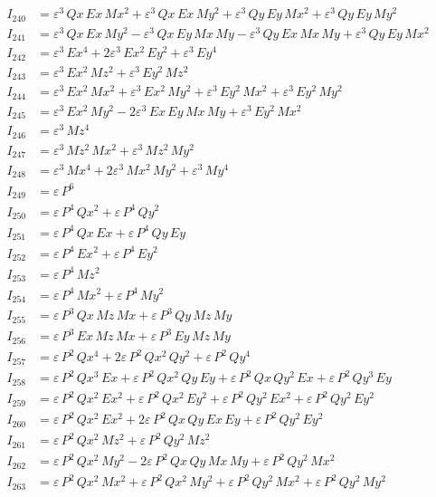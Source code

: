 \documentclass{article}
\begin{document}
\begin{align*}
I_{240} &= ε^{3}\,Qx\,Ex\,Mx^{2} + ε^{3}\,Qx\,Ex\,My^{2} + ε^{3}\,Qy\,Ey\,Mx^{2} + ε^{3}\,Qy\,Ey\,My^{2} \\
I_{241} &= ε^{3}\,Qx\,Ex\,My^{2} -ε^{3}\,Qx\,Ey\,Mx\,My -ε^{3}\,Qy\,Ex\,Mx\,My + ε^{3}\,Qy\,Ey\,Mx^{2} \\
I_{242} &= ε^{3}\,Ex^{4} + 2ε^{3}\,Ex^{2}\,Ey^{2} + ε^{3}\,Ey^{4} \\
I_{243} &= ε^{3}\,Ex^{2}\,Mz^{2} + ε^{3}\,Ey^{2}\,Mz^{2} \\
I_{244} &= ε^{3}\,Ex^{2}\,Mx^{2} + ε^{3}\,Ex^{2}\,My^{2} + ε^{3}\,Ey^{2}\,Mx^{2} + ε^{3}\,Ey^{2}\,My^{2} \\
I_{245} &= ε^{3}\,Ex^{2}\,My^{2} - 2ε^{3}\,Ex\,Ey\,Mx\,My + ε^{3}\,Ey^{2}\,Mx^{2} \\
I_{246} &= ε^{3}\,Mz^{4} \\
I_{247} &= ε^{3}\,Mz^{2}\,Mx^{2} + ε^{3}\,Mz^{2}\,My^{2} \\
I_{248} &= ε^{3}\,Mx^{4} + 2ε^{3}\,Mx^{2}\,My^{2} + ε^{3}\,My^{4} \\
I_{249} &= ε\,P^{6} \\
I_{250} &= ε\,P^{4}\,Qx^{2} + ε\,P^{4}\,Qy^{2} \\
I_{251} &= ε\,P^{4}\,Qx\,Ex + ε\,P^{4}\,Qy\,Ey \\
I_{252} &= ε\,P^{4}\,Ex^{2} + ε\,P^{4}\,Ey^{2} \\
I_{253} &= ε\,P^{4}\,Mz^{2} \\
I_{254} &= ε\,P^{4}\,Mx^{2} + ε\,P^{4}\,My^{2} \\
I_{255} &= ε\,P^{3}\,Qx\,Mz\,Mx + ε\,P^{3}\,Qy\,Mz\,My \\
I_{256} &= ε\,P^{3}\,Ex\,Mz\,Mx + ε\,P^{3}\,Ey\,Mz\,My \\
I_{257} &= ε\,P^{2}\,Qx^{4} + 2ε\,P^{2}\,Qx^{2}\,Qy^{2} + ε\,P^{2}\,Qy^{4} \\
I_{258} &= ε\,P^{2}\,Qx^{3}\,Ex + ε\,P^{2}\,Qx^{2}\,Qy\,Ey + ε\,P^{2}\,Qx\,Qy^{2}\,Ex + ε\,P^{2}\,Qy^{3}\,Ey \\
I_{259} &= ε\,P^{2}\,Qx^{2}\,Ex^{2} + ε\,P^{2}\,Qx^{2}\,Ey^{2} + ε\,P^{2}\,Qy^{2}\,Ex^{2} + ε\,P^{2}\,Qy^{2}\,Ey^{2} \\
I_{260} &= ε\,P^{2}\,Qx^{2}\,Ex^{2} + 2ε\,P^{2}\,Qx\,Qy\,Ex\,Ey + ε\,P^{2}\,Qy^{2}\,Ey^{2} \\
I_{261} &= ε\,P^{2}\,Qx^{2}\,Mz^{2} + ε\,P^{2}\,Qy^{2}\,Mz^{2} \\
I_{262} &= ε\,P^{2}\,Qx^{2}\,My^{2} - 2ε\,P^{2}\,Qx\,Qy\,Mx\,My + ε\,P^{2}\,Qy^{2}\,Mx^{2} \\
I_{263} &= ε\,P^{2}\,Qx^{2}\,Mx^{2} + ε\,P^{2}\,Qx^{2}\,My^{2} + ε\,P^{2}\,Qy^{2}\,Mx^{2} + ε\,P^{2}\,Qy^{2}\,My^{2} \\

\end{align*}
\end{document}
